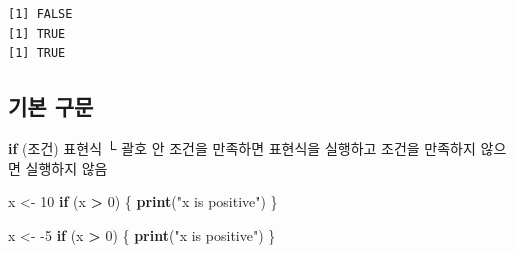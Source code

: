 \documentclass[
  11pt,
]{krantz}
\newenvironment{Shaded}{\begin{snugshade}}{\end{snugshade}}
\newcommand{\CommentTok}[1]{\textcolor[rgb]{0.37,0.37,0.37}{\textit{#1}}}
\newcommand{\ControlFlowTok}[1]{\textcolor[rgb]{0.27,0.27,0.27}{\textbf{#1}}}
\newcommand{\DecValTok}[1]{\textcolor[rgb]{0.06,0.06,0.06}{#1}}
\newcommand{\KeywordTok}[1]{\textcolor[rgb]{0.27,0.27,0.27}{\textbf{#1}}}
\newcommand{\NormalTok}[1]{#1}
\newcommand{\OperatorTok}[1]{\textcolor[rgb]{0.43,0.43,0.43}{\textbf{#1}}}
\newcommand{\StringTok}[1]{\textcolor[rgb]{0.5,0.5,0.5}{#1}}
\begin{document}
\footnotesize

\begin{Shaded}
\end{Shaded}

\begin{verbatim}
[1] FALSE
[1] TRUE
[1] TRUE
\end{verbatim}

\normalsize

\hypertarget{if-basic}{%
\subsection{\texorpdfstring{\textbf{기본 구문}}{기본 구문}}\label{if-basic}}

\footnotesize

\begin{Shaded}
\begin{Highlighting}[]
\ControlFlowTok{if}\NormalTok{ (조건) 표현식}
\NormalTok{ └ 괄호 안 조건을 만족하면 표현식을 실행하고 조건을 만족하지 않으면 실행하지 않음}
\end{Highlighting}
\end{Shaded}

\normalsize

\footnotesize

\begin{Shaded}
\begin{Highlighting}[]
\NormalTok{x <-}\StringTok{ }\DecValTok{10}
\ControlFlowTok{if}\NormalTok{ (x }\OperatorTok{>}\StringTok{ }\DecValTok{0}\NormalTok{) \{}
  \KeywordTok{print}\NormalTok{(}\StringTok{"x is positive"}\NormalTok{)}
\NormalTok{\}}

\NormalTok{x <-}\StringTok{ }\DecValTok{-5}
\ControlFlowTok{if}\NormalTok{ (x }\OperatorTok{>}\StringTok{ }\DecValTok{0}\NormalTok{) \{}
  \KeywordTok{print}\NormalTok{(}\StringTok{"x is positive"}\NormalTok{)}
\NormalTok{\}}
\end{Highlighting}
\end{Shaded}
\end{document}
